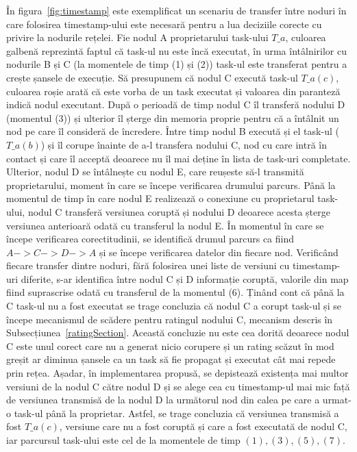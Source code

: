 \documentclass[12pt,a4paper]{report}
\begin{document}
În figura~\ref{fig:timestamp} este exemplificat un scenariu de transfer între noduri în care folosirea timestamp-ului este necesară pentru a lua deciziile corecte cu privire la nodurile rețelei. Fie nodul A proprietarului task-ului \textit{$T\_a$}, culoarea galbenă reprezintă faptul că task-ul nu este încă executat, în urma întâlnirilor cu nodurile B și C (la momentele de timp (1) și (2)) task-ul este transferat pentru a crește șansele de execuție. Să presupunem că nodul C execută task-ul \textit{$T\_a(c)$}, culoarea roșie arată că este vorba de un task executat și valoarea din paranteză indică nodul executant. După o perioadă de timp nodul C îl transferă nodului D (momentul (3)) și ulterior îl șterge din memoria proprie pentru că a întâlnit un nod pe care îl consideră de încredere. Între timp nodul B execută și el task-ul (\textit{$T\_a(b)$}) și îl corupe înainte de a-l transfera nodului C, nod cu care intră în contact și care îl acceptă deoarece nu îl mai deține în lista de task-uri completate. Ulterior, nodul D se întâlnește cu nodul E, care reușeste să-l transmită proprietarului, moment în care se începe verificarea drumului parcurs. Până la momentul de timp în care nodul E realizează o conexiune cu proprietarul task-ului, nodul C transferă versiunea coruptă și nodului D deoarece acesta șterge versiunea anterioară odată cu transferul la nodul E. În momentul în care se începe verificarea corectitudinii, se identifică drumul parcurs ca fiind $A->C->D->A$ și se începe verificarea datelor din fiecare nod. Verificând fiecare transfer dintre noduri, fără folosirea unei liste de versiuni cu timestamp-uri diferite, s-ar identifica între nodul C și D informație coruptă, valorile din map fiind suprascrise odată cu transferul de la momentul (6). Ținând cont că până la C task-ul nu a fost executat se trage concluzia că nodul C a corupt task-ul și se începe mecanismul de scădere pentru ratingul nodului C, mecanism descris în Subsecțiunea~\ref{ratingSection}. Această concluzie nu este cea dorită deoarece nodul C este unul corect care nu a generat nicio corupere și un rating scăzut în mod greșit ar diminua șansele ca un task să fie propagat și executat cât mai repede prin rețea. Așadar, în implementarea propusă, se depistează existența mai multor versiuni de la nodul C către nodul D și se alege cea cu timestamp-ul mai mic față de versiunea transmisă de la nodul D la următorul nod din calea pe care a urmat-o task-ul până la proprietar. Astfel, se trage concluzia că versiunea transmisă a fost $T\_a(c)$, versiune care nu a fost coruptă și care a fost executată de nodul C, iar parcursul task-ului este cel de la momentele de timp ${(1),(3),(5),(7)}$.
\end{document}
